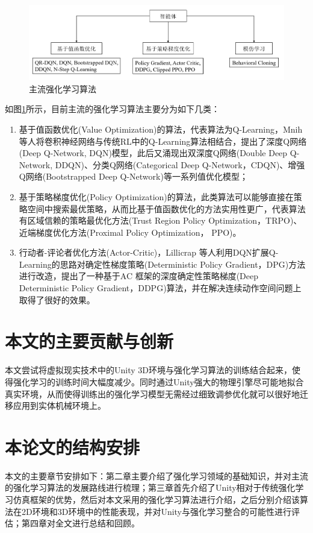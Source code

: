 \documentclass[bachelor]{thesis-uestc}
\begin{document}
	\begin{figure}
		\includegraphics[width=15cm]{./pic/fg6.jpg}
		\caption{主流强化学习算法}
		\label{fg6}
	\end{figure}
	
	如图\ref{fg6}所示，目前主流的强化学习算法主要分为如下几类：
	\begin{enumerate}
		\item 基于值函数优化(Value Optimization)的算法，代表算法为Q-Learning，Mnih 等人将卷积神经网络与传统RL中的Q-Learning算法相结合，提出了深度Q网络(Deep Q-Network, DQN)模型，此后又涌现出双深度Q网络(Double Deep Q-Network, DDQN)、分类Q网络(Categorical Deep Q-Network，CDQN)、增强Q网络(Bootstrapped Deep Q-Network)等一系列值优化模型；
		
		\item 基于策略梯度优化(Policy Optimization)的算法，此类算法可以能够直接在策略空间中搜索最优策略，从而比基于值函数优化的方法实用性更广，代表算法有区域信赖的策略最优化方法(Trust Region Policy Optimization，TRPO)、近端梯度优化方法(Proximal Policy Optimization， PPO)。
		
		\item 行动者-评论者优化方法(Actor-Critic)，Lillicrap 等人利用DQN扩展Q-Learning的思路对确定性梯度策略(Deterministic Policy Gradient，DPG)方法进行改造，提出了一种基于AC 框架的深度确定性策略梯度(Deep Deterministic Policy Gradient，DDPG)算法，并在解决连续动作空间问题上取得了很好的效果。
	\end{enumerate}
	
	\section{本文的主要贡献与创新}
	本文尝试将虚拟现实技术中的Unity 3D环境与强化学习算法的训练结合起来，使得强化学习的训练时间大幅度减少。同时通过Unity强大的物理引擎尽可能地拟合真实环境，从而使得训练出的强化学习模型无需经过细致调参优化就可以很好地迁移应用到实体机械环境上。
	
	\section{本论文的结构安排}
	本文的主要章节安排如下：第二章主要介绍了强化学习领域的基础知识，并对主流的强化学习算法的发展路线进行梳理；第三章首先介绍了Unity相对于传统强化学习仿真框架的优势，然后对本文采用的强化学习算法进行介绍，之后分别介绍该算法在2D环境和3D环境中的性能表现，并对Unity与强化学习整合的可能性进行评估；第四章对全文进行总结和回顾。
	
\end{document}
